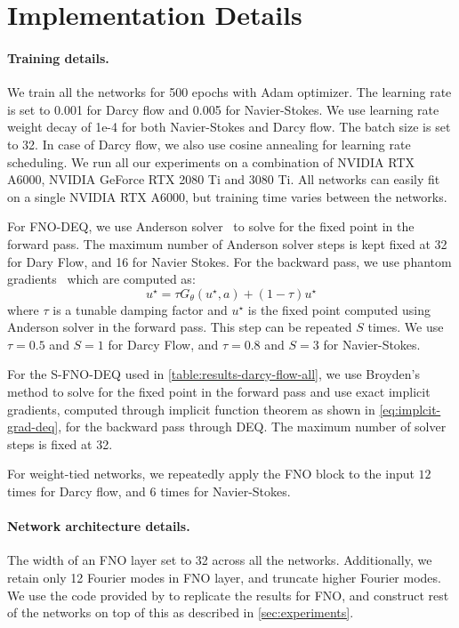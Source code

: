 \section{Implementation Details}
\label{sec:implementation_details}

\paragraph{Training details.} We train all the networks for 500 epochs  with Adam optimizer. 
The learning rate is set to 0.001 for Darcy flow and 0.005 for Navier-Stokes. We use learning rate weight decay of 1e-4 for both Navier-Stokes and Darcy flow. The batch size is set to 32.
In case of Darcy flow, we also use cosine annealing for learning rate scheduling. 
We run all our experiments on a combination of NVIDIA RTX A6000, NVIDIA GeForce RTX 2080 Ti and 3080 Ti. 
All networks can easily fit on a single NVIDIA RTX A6000, but training time varies between the networks. 

For FNO-DEQ, we use Anderson solver~\citep{anderson1965iterative} to solve for the fixed point in the forward pass. The maximum number of Anderson solver steps is kept fixed at 32 for Dary Flow, and 16 for Navier Stokes. For the backward pass, we use phantom gradients~\citep{geng2021training} which are computed as:
\begin{equation}
    \label{eq:phatom-grad}
    u^\star = \tau G_\theta(u^\star, a) + (1 - \tau)u^\star
\end{equation}
where $\tau$ is a tunable damping factor and $u^\star$ is the fixed point computed using Anderson solver in the forward pass. This step can be repeated $S$ times. We use $\tau=0.5$ and $S=1$ for Darcy Flow, and $\tau=0.8$ and $S=3$ for Navier-Stokes. 

For the S-FNO-DEQ used in \cref{table:results-darcy-flow-all}, we use Broyden's method \citep{broyden1965class} to solve for the fixed point in the forward pass and use exact implicit gradients, computed through implicit function theorem as shown in \cref{eq:implcit-grad-deq}, for the backward pass through DEQ. The maximum number of solver steps is fixed at 32.

For weight-tied networks, we repeatedly apply the FNO block to the input $12$ times for Darcy flow, and $6$ times for Navier-Stokes.

\paragraph{Network architecture details.} The width of an FNO layer set to 32 across all the networks. Additionally, we retain only 12 Fourier modes in FNO layer, and truncate higher Fourier modes. We use the code provided by \citet{li2020fourier} to replicate the results for FNO, and construct rest of the networks on top of this as described in \cref{sec:experiments}.








